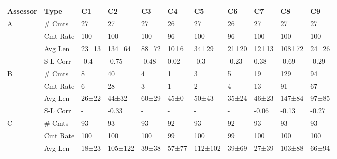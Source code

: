 \begin{table}[]
    \centering
    \footnotesize

\begin{tabular}{lllllllllll}
\toprule
Assessor &      Type &            C1 &              C2 &            C3 &            C4 &              C5 &            C6 &            C7 &             C8 &            C9 \\
\midrule
A &    \# Cmts &            27 &              27 &            27 &            26 &              27 &            26 &            27 &             27 &            27 \\
   &  Cmt Rate &           100 &             100 &           100 &            96 &             100 &            96 &           100 &            100 &           100 \\
    &   Avg Len &  23{\tiny±13} &   134{\tiny±64} &  88{\tiny±72} &   10{\tiny±6} &    34{\tiny±29} &  21{\tiny±20} &  12{\tiny±13} &  108{\tiny±72} &  24{\tiny±26} \\
    &  S-L Corr &          -0.4 &           -0.75 &         -0.48 &          0.02 &            -0.3 &         -0.23 &          0.38 &          -0.69 &         -0.29 \\ \midrule
B &    \# Cmts &             8 &              40 &             4 &             1 &               3 &             5 &            19 &            129 &            94 \\
    &  Cmt Rate &             6 &              28 &             3 &             1 &               2 &             4 &            13 &             91 &            67 \\
      &   Avg Len &  26{\tiny±22} &    44{\tiny±32} &  60{\tiny±29} &   45{\tiny±0} &    50{\tiny±43} &  35{\tiny±24} &  46{\tiny±23} &  147{\tiny±84} &  97{\tiny±85} \\
      &  S-L Corr &           - &           -0.33 &           - &           - &             - &           - &         -0.06 &          -0.13 &         -0.27 \\ \midrule
    C &    \# Cmts &            93 &              93 &            93 &            92 &              93 &            92 &            93 &             93 &            93 \\
       &  Cmt Rate &           100 &             100 &           100 &            99 &             100 &            99 &           100 &            100 &           100 \\
      &   Avg Len &  18{\tiny±23} &  105{\tiny±122} &  39{\tiny±38} &  57{\tiny±77} &  112{\tiny±102} &  39{\tiny±69} &  27{\tiny±39} &  103{\tiny±88} &  66{\tiny±94} \\

\end{tabular}
\end{table}

